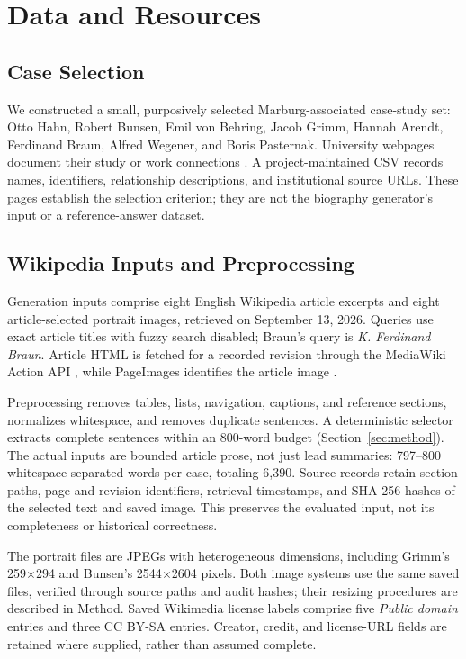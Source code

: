 \documentclass[11pt]{article}
\begin{document}
\section{Data and Resources}
\label{sec:data}

\subsection{Case Selection}

We constructed a small, purposively selected Marburg-associated case-study set: Otto Hahn, Robert Bunsen, Emil von Behring, Jacob Grimm, Hannah Arendt, Ferdinand Braun, Alfred Wegener, and Boris Pasternak. University webpages document their study or work connections \citep{marburg-famous-lecturers-students,marburg-arendt-archive}. A project-maintained CSV records names, identifiers, relationship descriptions, and institutional source URLs. These pages establish the selection criterion; they are not the biography generator's input or a reference-answer dataset.


\subsection{Wikipedia Inputs and Preprocessing}

Generation inputs comprise eight English Wikipedia article excerpts and eight article-selected portrait images, retrieved on September 13, 2026. Queries use exact article titles with fuzzy search disabled; Braun's query is \emph{K. Ferdinand Braun}. Article HTML is fetched for a recorded revision through the MediaWiki Action API \citep{mediawiki-parse-api}, while PageImages identifies the article image \citep{mediawiki-pageimages}.

Preprocessing removes tables, lists, navigation, captions, and reference sections, normalizes whitespace, and removes duplicate sentences. A deterministic selector extracts complete sentences within an 800-word budget (Section~\ref{sec:method}). The actual inputs are bounded article prose, not just lead summaries: 797--800 whitespace-separated words per case, totaling 6,390. Source records retain section paths, page and revision identifiers, retrieval timestamps, and SHA-256 hashes of the selected text and saved image. This preserves the evaluated input, not its completeness or historical correctness.

The portrait files are JPEGs with heterogeneous dimensions, including Grimm's 259$\times$294 and Bunsen's 2544$\times$2604 pixels. Both image systems use the same saved files, verified through source paths and audit hashes; their resizing procedures are described in Method. Saved Wikimedia license labels comprise five \emph{Public domain} entries and three CC BY-SA entries. Creator, credit, and license-URL fields are retained where supplied, rather than assumed complete.
\end{document}
